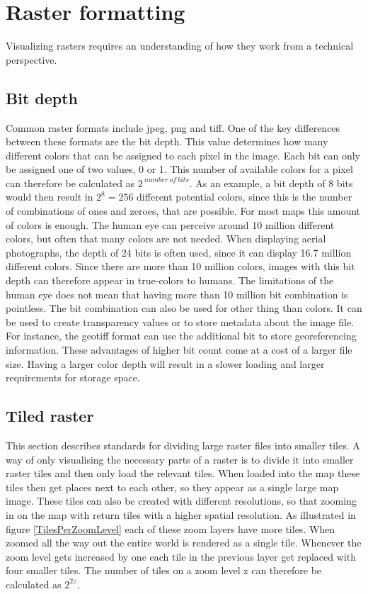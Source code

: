 \chapter{Raster formatting}\label{CRasterFormatting}

Visualizing rasters requires an understanding of how they work from a technical perspective.

\section{Bit depth} \label{BitDepth}
Common raster formats include jpeg, png and tiff. One of the key differences between these formats are the bit depth. This value determines how many different colors that can be assigned to each pixel in the image. Each bit can only be assigned one of two values, 0 or 1. This number of available colors for a pixel can therefore be calculated as $2^{\:number\: of\: bits}$. As an example, a bit depth of 8 bits would then result in $2^8 = 256$ different potential colors, since this is the number of combinations of ones and zeroes, that are possible. For most maps this amount of colors is enough. The human eye can perceive around 10 million different colors, but often that many colors are not needed. When displaying aerial photographs, the depth of 24 bits is often used, since it can display 16.7 million different colors. Since there are more than 10 million colors, images with this bit depth can therefore appear in true-colors to humans.
The limitations of the human eye does not mean that having more than 10 million bit combination is pointless. The bit combination can also be used for other thing than colors. It can be used to create transparency values or to store metadata about the image file. For instance, the geotiff format can use the additional bit to store georeferencing information.
These advantages of higher bit count come at a cost of a larger file size. Having a larger color depth will result in a slower loading and larger requirements for storage space. \citep{Dent} %

\section{Tiled raster}\label{TiledRaster}
This section describes standards for dividing large raster files into smaller tiles. 
A way of only visualising the necessary parts of a raster is to divide it into smaller raster tiles and then only load the relevant tiles. When loaded into the map these tiles then get places next to each other, so they appear as a single large map image. These tiles can also be created with different resolutions, so that zooming in on the map with return tiles with a higher spatial resolution.  As illustrated in figure \ref{TilesPerZoomLevel} each of these zoom layers have more tiles.
\citep{Liedman}
When zoomed all the way out the entire world is rendered as a single tile. Whenever the zoom level gets increased by one each tile in the previous layer get replaced with four smaller tiles. The number of tiles on a zoom level z can therefore be calculated as $2^{2z}$.
\citep{SlippyMap}

